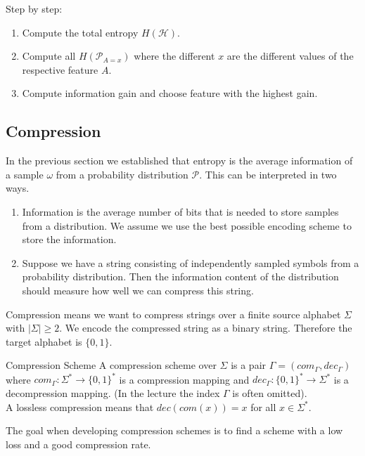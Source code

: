 \documentclass[english]{panikzettel}
\begin{document}
Step by step:
\begin{enumerate}
    \item Compute the total entropy $H(\mathcal{H})$.
    \item Compute all $H(\mathcal{P}_{A=x})$ where the different $x$ are the different values of the respective feature $A$.
    \item Compute information gain and choose feature with the highest gain.
\end{enumerate}

\subsection{Compression}
In the previous section we established that entropy is the average information of a sample $\omega$ from a probability distribution $\mathcal{P}$. This can be interpreted in two ways.
\begin{enumerate}
\item Information is the average number of bits that is needed to store samples from a distribution. We assume we use the best possible encoding scheme to store the information.
\item Suppose we have a string consisting of independently sampled symbols from a probability distribution. Then the information content of the distribution should measure how well we can compress this string.
\end{enumerate}

Compression means we want to compress strings over a finite source alphabet $\Sigma$ with $|\Sigma|\geq 2$. We encode the compressed string as a binary string. Therefore the target alphabet is $\{0,1\}$.

\begin{defi}{Compression Scheme}
A compression scheme over $\Sigma$ is a pair $\Gamma=(com_\Gamma, dec_\Gamma)$ where $com_\Gamma: \Sigma^* \rightarrow \{0,1\}^*$ is a compression mapping and $dec_\Gamma:\{0,1\}^*\to \Sigma^*$ is a decompression mapping. (In the lecture the index $\Gamma$ is often omitted).\\
A lossless compression means that $dec(com(x))=x$ for all $x\in\Sigma^*$.\\
\end{defi}

The goal when developing compression schemes is to find a scheme with a low loss and a good compression rate.
\end{document}
